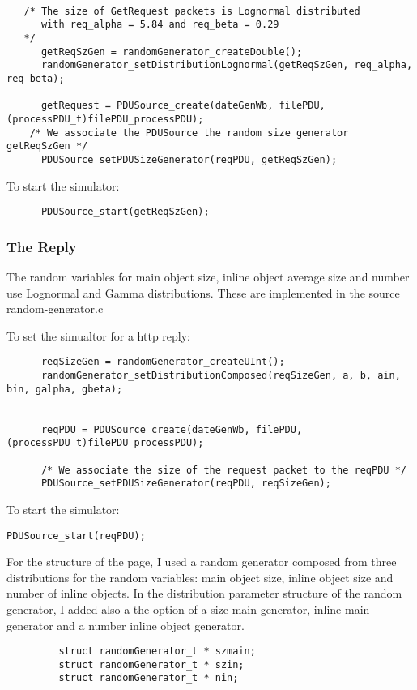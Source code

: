 \begin{verbatim}

   /* The size of GetRequest packets is Lognormal distributed 
      with req_alpha = 5.84 and req_beta = 0.29
   */    
      getReqSzGen = randomGenerator_createDouble();
      randomGenerator_setDistributionLognormal(getReqSzGen, req_alpha, req_beta);
      
      getRequest = PDUSource_create(dateGenWb, filePDU, (processPDU_t)filePDU_processPDU); 
    /* We associate the PDUSource the random size generator getReqSzGen */
      PDUSource_setPDUSizeGenerator(reqPDU, getReqSzGen);

\end{verbatim}

 To start the simulator:
\begin{verbatim}
      PDUSource_start(getReqSzGen);
\end{verbatim}

\subsubsection{The Reply} 

The random variables for main object size, inline object average size and number use Lognormal and Gamma distributions.
 These are implemented in the source random-generator.c

To set the simualtor for a http reply:

\begin{verbatim}
      reqSizeGen = randomGenerator_createUInt();
      randomGenerator_setDistributionComposed(reqSizeGen, a, b, ain, bin, galpha, gbeta);
      
 
      reqPDU = PDUSource_create(dateGenWb, filePDU, (processPDU_t)filePDU_processPDU);  
  
      /* We associate the size of the request packet to the reqPDU */
      PDUSource_setPDUSizeGenerator(reqPDU, reqSizeGen);
\end{verbatim}

 To start the simulator:
\begin{verbatim}
PDUSource_start(reqPDU);
\end{verbatim}
 
  For the structure of the page, I used a random generator composed from three distributions for the random variables: main object size, inline object size and number of inline objects.
  In the distribution parameter structure of the random generator, I added also a the option of a size main generator, inline main generator and a number inline object generator.

\begin{verbatim}
         struct randomGenerator_t * szmain;
         struct randomGenerator_t * szin;
         struct randomGenerator_t * nin;
\end{verbatim} 



